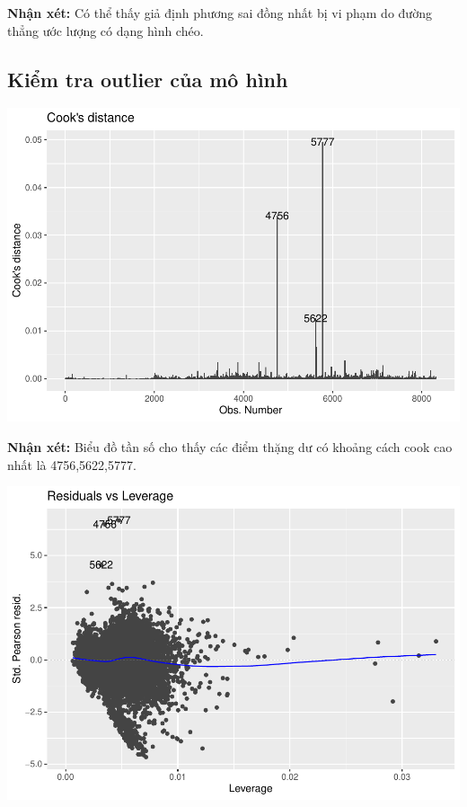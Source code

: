 \documentclass[
  11pt,
  letterpaper,
]{article}
\begin{document}
\textbf{Nhận xét:} Có thể thấy giả định phương sai đồng nhất bị vi phạm do đường thẳng ước lượng có dạng hình chéo.

\subsection{Kiểm tra outlier của mô hình}

\begin{center}\includegraphics[width=1.2\linewidth,]{Final_Project_files/figure-latex/unnamed-chunk-36-1} \end{center}

\textbf{Nhận xét:} Biểu đồ tần số cho thấy các điểm thặng dư có khoảng cách cook cao nhất là 4756,5622,5777.

\begin{center}\includegraphics[width=1.2\linewidth,]{Final_Project_files/figure-latex/unnamed-chunk-37-1} \end{center}
\end{document}
